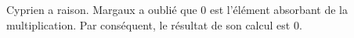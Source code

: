 %
%
    Cyprien a raison. Margaux a oublié que 0 est l'élément absorbant de la multiplication. Par conséquent, le résultat de son calcul est 0.
